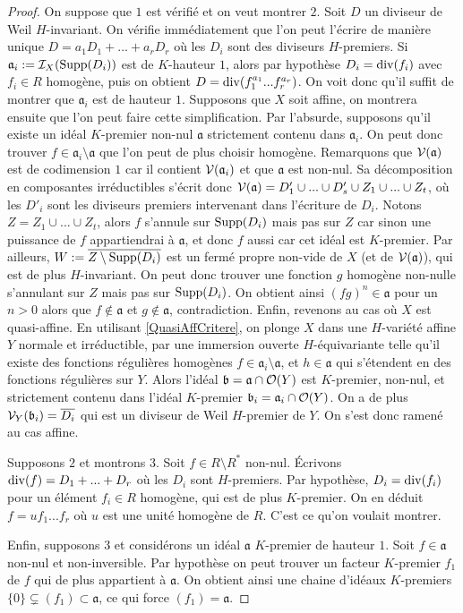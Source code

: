 \begin{proof}
On suppose que $1$ est vérifié et on veut montrer $2$. Soit $D$ un diviseur de Weil $H$-invariant. On vérifie immédiatement que l'on peut l'écrire de manière unique $D=a_1D_1+...+a_rD_r$ où les $D_i$ sont des diviseurs $H$-premiers. Si $\mathfrak{a}_i:=\mathcal{I}_X(\operatorname{Supp}(D_i))$ est de $K$-hauteur $1$, alors par hypothèse $D_i=\operatorname{div}(f_i)$ avec $f_i\in R$ homogène, puis on obtient $D=\operatorname{div}(f_1^{a_1}...f_r^{a_r})$. On voit donc qu'il suffit de montrer que $\mathfrak{a}_i$ est de hauteur $1$. Supposons que $X$ soit affine, on montrera ensuite que l'on peut faire cette simplification. Par l'absurde, supposons qu'il existe un idéal $K$-premier non-nul $\mathfrak{a}$ strictement contenu dans $\mathfrak{a}_i$. On peut donc trouver $f\in \mathfrak{a}_i\setminus\mathfrak{a}$	 que l'on peut de plus choisir homogène. Remarquons que $\mathcal{V}(\mathfrak{a})$ est de codimension $1$ car il contient $\mathcal{V}(\mathfrak{a}_i)$ et que $\mathfrak{a}$ est non-nul. Sa décomposition en composantes irréductibles s'écrit donc $\mathcal{V}(\mathfrak{a})=D'_1\cup...\cup D'_s\cup Z_1\cup ...\cup Z_t$, où les $D'_i$ sont les diviseurs premiers intervenant dans l'écriture de $D_i$. Notons $Z=Z_1\cup ...\cup Z_t$, alors $f$ s'annule sur $\operatorname{Supp}(D_i)$ mais pas sur $Z$ car sinon une puissance de $f$ appartiendrai à $\mathfrak{a}$, et donc $f$ aussi car cet idéal est $K$-premier. Par ailleurs, $W:=\overline{Z\setminus \operatorname{Supp}(D_i)}$ est un fermé propre non-vide de $X$ (et de $\mathcal{V}(\mathfrak{a})$), qui est de plus $H$-invariant. On peut donc trouver une fonction $g$ homogène non-nulle s'annulant sur $Z$ mais pas sur $\operatorname{Supp}(D_i)$. On obtient ainsi $(fg)^n\in\mathfrak{a}$ pour un $n>0$ alors que $f\notin \mathfrak{a}$ et $g\notin\mathfrak{a}$, contradiction. Enfin, revenons au cas où $X$ est quasi-affine. En utilisant \ref{QuasiAffCritere}, on plonge $X$ dans une $H$-variété affine $Y$ normale et irréductible, par une immersion ouverte $H$-équivariante telle qu'il existe des fonctions régulières homogènes $f\in\mathfrak{a}_i\setminus \mathfrak{a}$, et $h\in\mathfrak{a}$ qui s'étendent en des fonctions régulières sur $Y$. Alors l'idéal $\mathfrak{b}=\mathfrak{a}\cap \mathcal{O}(Y)$ est $K$-premier, non-nul, et strictement contenu dans l'idéal $K$-premier $\mathfrak{b}_i=\mathfrak{a}_i\cap \mathcal{O}(Y)$. On a de plus $\mathcal{V}_Y(\mathfrak{b}_i)=\overline{D_i}$ qui est un diviseur de Weil $H$-premier de $Y$. On s'est donc ramené au cas affine.

Supposons $2$ et montrons $3$. Soit $f\in R\setminus R^*$ non-nul. Écrivons $\operatorname{div}(f)=D_1+...+D_r$ où les $D_i$ sont $H$-premiers. Par hypothèse, $D_i=\operatorname{div}(f_i)$ pour un élément $f_i\in R$ homogène, qui est de plus $K$-premier. On en déduit $f=uf_1...f_r$ où $u$ est une unité homogène de $R$. C'est ce qu'on voulait montrer.

Enfin, supposons $3$ et considérons un idéal $\mathfrak{a}$ $K$-premier de hauteur $1$. Soit $f\in\mathfrak{a}$ non-nul et non-inversible. Par hypothèse on peut trouver un facteur $K$-premier $f_1$ de $f$ qui de plus appartient à $\mathfrak{a}$. On obtient ainsi une chaine d'idéaux $K$-premiers $\lbrace 0\rbrace\varsubsetneq (f_1)\subset \mathfrak{a}$, ce qui force $(f_1)=\mathfrak{a}$.
\end{proof}

